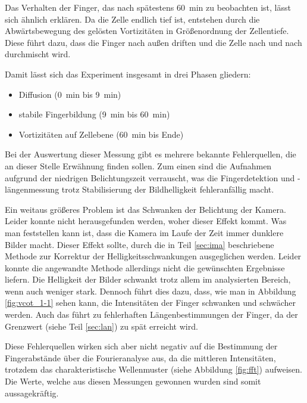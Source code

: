 Das Verhalten der Finger, das nach spätestens \SI{60}{\minute} zu beobachten ist, lässt sich ähnlich erklären. Da die Zelle endlich tief ist, entstehen durch die Abwärtsbewegung des gelösten \COT Vortizitäten in Größenordnung der Zellentiefe. Diese führt dazu, dass die Finger nach außen driften und die Zelle nach und nach durchmischt wird.

Damit lässt sich das Experiment insgesamt in drei Phasen gliedern:
\begin{itemize}
 \item Diffusion (\SI{0}{\minute} bis \SI{9}{\minute})
 \item stabile Fingerbildung (\SI{9}{\minute} bis \SI{60}{\minute})
 \item Vortizitäten auf Zellebene (\SI{60}{\minute} bis Ende)
\end{itemize}


Bei der Auswertung dieser Messung gibt es mehrere bekannte Fehlerquellen, die an dieser Stelle Erwähnung finden sollen. Zum einen sind die Aufnahmen aufgrund der niedrigen Belichtungszeit verrauscht, was die Fingerdetektion und -längenmessung trotz Stabilisierung der Bildhelligkeit fehleranfällig macht.

Ein weitaus größeres Problem ist das Schwanken der Belichtung der Kamera. Leider konnte nicht herausgefunden werden, woher dieser Effekt kommt. Was man feststellen kann ist, dass die Kamera im Laufe der Zeit immer dunklere Bilder macht. Dieser Effekt sollte, durch die in Teil \ref{sec:ima} beschriebene Methode zur Korrektur der Helligkeitsschwankungen ausgeglichen werden. Leider konnte die angewandte Methode allerdings nicht die gewünschten Ergebnisse liefern. Die Helligkeit der Bilder schwankt trotz allem im analysierten Bereich, wenn auch weniger stark. Dennoch führt dies dazu, dass, wie man in Abbildung \ref{fig:vcot_1-1} sehen kann, die Intensitäten der Finger schwanken und schwächer werden. Auch das führt zu fehlerhaften Längenbestimmungen der Finger, da der Grenzwert (siehe Teil \ref{sec:lan}) zu spät erreicht wird.

Diese Fehlerquellen wirken sich aber nicht negativ auf die Bestimmung der Fingerabstände über die Fourieranalyse aus, da die mittleren Intensitäten, trotzdem das charakteristische Wellenmuster (siehe Abbildung \ref{fig:fft}) aufweisen. Die Werte, welche aus diesen Messungen gewonnen wurden sind somit aussagekräftig.



